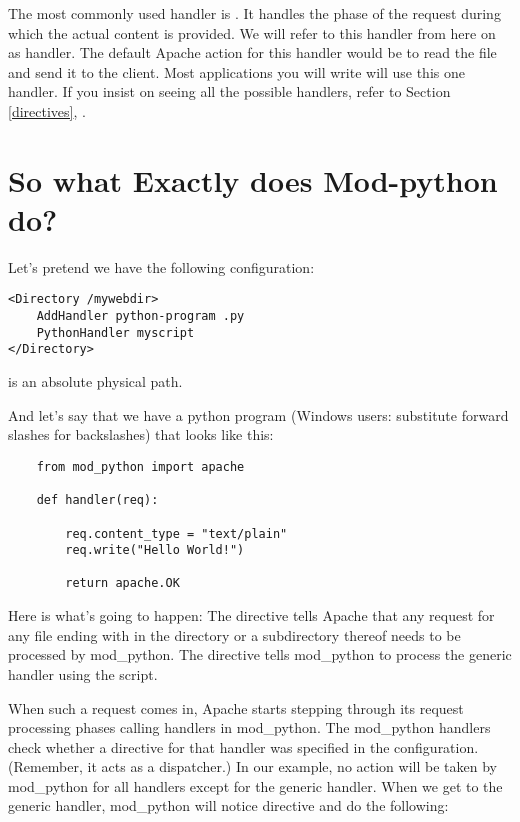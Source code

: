 The most commonly used handler is . It handles the
phase of the request during which the actual content is provided. We
will refer to this handler from here on as  handler. The
default Apache action for this handler would be to read the file and
send it to the client. Most applications you will write will use this
one handler. If you insist on seeing all the possible handlers, refer
to Section \ref{directives}, .

\section{So what Exactly does Mod-python do?\label{tut-what-it-do}}

Let's pretend we have the following configuration: 
\begin{verbatim}
<Directory /mywebdir>
    AddHandler python-program .py
    PythonHandler myscript
</Directory>
\end{verbatim}

  is an absolute physical path. 

And let's say that we have a python program (Windows users: substitute
forward slashes for backslashes)  that looks like
this:

\begin{verbatim}
    from mod_python import apache

    def handler(req):

        req.content_type = "text/plain"
        req.write("Hello World!")

        return apache.OK
\end{verbatim}    

Here is what's going to happen: The  directive tells
Apache that any request for any file ending with  in the
 directory or a subdirectory thereof needs to be
processed by mod_python. The  directive
tells mod_python to process the generic handler using the
 script.

When such a request comes in, Apache starts stepping through its
request processing phases calling handlers in mod_python. The
mod_python handlers check whether a directive for that handler was
specified in the configuration. (Remember, it acts as a dispatcher.)
In our example, no action will be taken by mod_python for
all handlers except for the generic handler. When we get to the
generic handler, mod_python will notice  directive and do the following:

